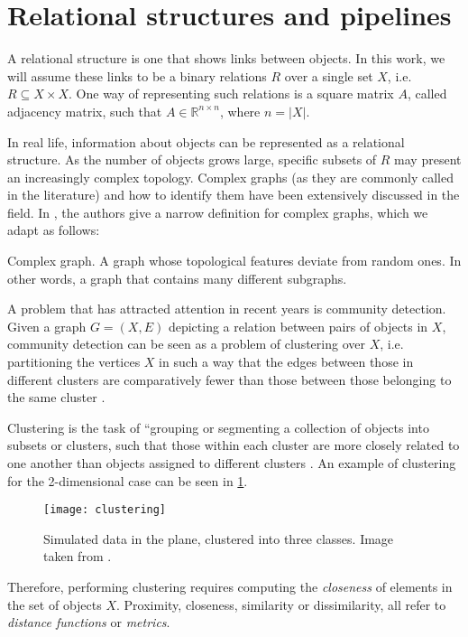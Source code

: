 \documentclass[../main.tex]{subfiles} \label{chapter_soa}
\begin{document}
\section{Relational structures and pipelines}\label{general_pipeline}
A relational structure is one that shows links between objects. In this work, we will assume these links to be a binary relations $R$ over a single set $X$, i.e. $R \subseteq X \times X$. One way of representing such relations is a square matrix $A$, called adjacency matrix, such that $A \in \mathbb{R}^{n \times n}$, where $n =\left\vert{X}\right\vert$.
\par In real life, information about objects can be represented as a relational structure. As the number of objects grows large, specific subsets of $R$ may present an increasingly complex topology. Complex graphs (as they are commonly called in the literature) and how to identify them have been extensively discussed in the field. In \cite{Kim2008}, the authors give a narrow definition for complex graphs, which we adapt as follows:
\theoremstyle{definition}
\begin{definition}{Complex graph}. A graph whose topological features deviate from random ones. In other words, a graph that contains many different subgraphs.
\end{definition}
\par A problem that has attracted attention in recent years is community detection. Given a graph $G = (X, E)$ depicting a relation between pairs of objects in $X$, community detection can be seen as a problem of clustering over $X$, i.e. partitioning the vertices $X$ in such a way that the edges between those in different clusters are comparatively fewer than those between those belonging to the same cluster \cite{Fortunato2010}. 
\par Clustering is the task of ``grouping or segmenting a collection of objects into subsets or clusters, such that those within each cluster are more closely related to one another than objects assigned to different clusters \cite{hastie2008}. An example of clustering for the 2-dimensional case can be seen in \ref{clustering}.
\begin{figure}[ht]
\centering
\texttt{[image: clustering]}
\caption{Simulated data in the plane, clustered into three classes. Image taken from \cite{hastie2008}.}
\label{clustering}
\end{figure}
\par Therefore, performing clustering requires computing the \emph{closeness} of elements in the set of objects $X$. Proximity, closeness, similarity or dissimilarity, all refer to \emph{distance functions} or \emph{metrics}. 
\end{document}
